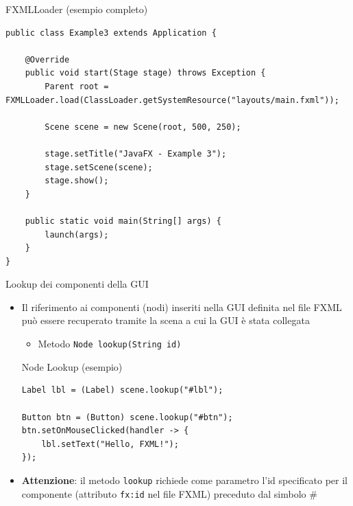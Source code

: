 \documentclass[xcolor=dvipsnames,presentation]{beamer}
\begin{document}
\begin{frame}[fragile]{FXMLLoader (esempio completo)}
\begin{lstlisting}
public class Example3 extends Application {

	@Override
	public void start(Stage stage) throws Exception {
	    Parent root = FXMLLoader.load(ClassLoader.getSystemResource("layouts/main.fxml"));

		Scene scene = new Scene(root, 500, 250);

		stage.setTitle("JavaFX - Example 3");
		stage.setScene(scene);
		stage.show();
	}

	public static void main(String[] args) {
		launch(args);
	}
}
\end{lstlisting}
\end{frame}

\begin{frame}[fragile]{Lookup dei componenti della GUI}
\begin{itemize}
\item Il riferimento ai componenti (nodi) inseriti nella GUI definita nel file FXML può essere recuperato tramite la scena a cui la GUI è stata collegata
\begin{itemize}
\item Metodo \texttt{Node lookup(String id)}
\end{itemize}

\begin{block}{Node Lookup (esempio)}
\begin{lstlisting}
Label lbl = (Label) scene.lookup("#lbl");

Button btn = (Button) scene.lookup("#btn");
btn.setOnMouseClicked(handler -> {
	lbl.setText("Hello, FXML!");
});
\end{lstlisting}
\end{block}
\item \textbf{Attenzione}: il metodo \texttt{lookup} richiede come parametro l'id specificato per il componente (attributo \texttt{fx:id} nel file FXML) preceduto dal simbolo \#
\end{itemize}
\end{frame}
\end{document}
